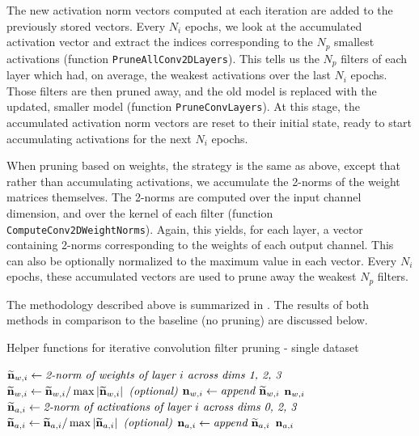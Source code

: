 \documentclass{article}
\begin{document}
The new activation norm vectors computed at each iteration are added to the previously stored vectors. Every $N_i$ epochs, we look at the accumulated activation vector and extract the indices corresponding to the $N_p$ smallest activations (function \texttt{PruneAllConv2DLayers}). This tells us the $N_p$ filters of each layer which had, on average, the weakest activations over the last $N_i$ epochs. Those filters are then pruned away, and the old model is replaced with the updated, smaller model (function \texttt{PruneConvLayers}). At this stage, the accumulated activation norm vectors are reset to their initial state, ready to start accumulating activations for the next $N_i$ epochs.

When pruning based on weights, the strategy is the same as above, except that rather than accumulating activations, we accumulate the 2-norms of the weight matrices themselves. The 2-norms are computed over the input channel dimension, and over the kernel of each filter (function \texttt{ComputeConv2DWeightNorms}). Again, this yields, for each layer, a vector containing 2-norms corresponding to the weights of each output channel. This can also be optionally normalized to the maximum value in each vector. Every $N_i$ epochs, these accumulated vectors are used to prune away the weakest $N_p$ filters.

The methodology described above is summarized in .
The results of both methods in comparison to the baseline (no pruning) are discussed below.

\begin{algorithm}[t]
	\caption{Helper functions for iterative convolution filter pruning - single dataset} \label{FilterPruneBasic}
	\begin{algorithmic}[1]
				\State $\widetilde{\bm{\mathrm{n}}}_{w,i} \gets \textit{2-norm of weights of layer }i\textit{ across dims 1, 2, 3}$
				\State $\widetilde{\bm{\mathrm{n}}}_{w,i} \gets \widetilde{\bm{\mathrm{n}}}_{w,i} / \max\left \lvert \widetilde{\bm{\mathrm{n}}}_{w,i} \right\rvert \textit{ (optional)}$
				\State $\bm{\mathrm{n}}_{w,i} \gets \textit{append }\widetilde{\bm{\mathrm{n}}}_{w,i}$
			\EndFor
			\State \Return $\bm{\mathrm{n}}_{w,i}$
		\EndFunction
		\\
				\State $\widetilde{\bm{\mathrm{n}}}_{a,i} \gets \textit{2-norm of activations of layer }i\textit{ across dims 0, 2, 3}$
				\State $\widetilde{\bm{\mathrm{n}}}_{a,i} \gets \widetilde{\bm{\mathrm{n}}}_{a,i} / \max\left \lvert \widetilde{\bm{\mathrm{n}}}_{a,i} \right\rvert \textit{ (optional)}$
				\State $\bm{\mathrm{n}}_{a,i} \gets \textit{append }\widetilde{\bm{\mathrm{n}}}_{a,i}$
			\EndFor
			\State \Return $\bm{\mathrm{n}}_{a,i}$
		\EndFunction
%
	\end{algorithmic}
\end{algorithm}
\end{document}

